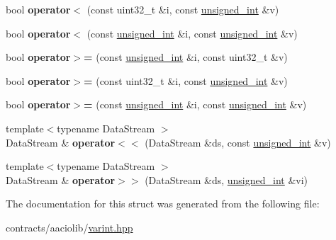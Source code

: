 \begin{DoxyCompactItemize}
bool {\bfseries operator$<$} (const uint32\+\_\+t \&i, const \mbox{\hyperlink{structunsigned__int}{unsigned\+\_\+int}} \&v)
\item 
\mbox{\label{structunsigned__int_a5c44ed2d978a1bdaf65166f98592192c}} 
bool {\bfseries operator$<$} (const \mbox{\hyperlink{structunsigned__int}{unsigned\+\_\+int}} \&i, const \mbox{\hyperlink{structunsigned__int}{unsigned\+\_\+int}} \&v)
\item 
\mbox{\label{structunsigned__int_abf1274ffb924723bc12f17544159c799}} 
bool {\bfseries operator$>$=} (const \mbox{\hyperlink{structunsigned__int}{unsigned\+\_\+int}} \&i, const uint32\+\_\+t \&v)
\item 
\mbox{\label{structunsigned__int_ad6f6d75188bb59e24af40ff8aa4de947}} 
bool {\bfseries operator$>$=} (const uint32\+\_\+t \&i, const \mbox{\hyperlink{structunsigned__int}{unsigned\+\_\+int}} \&v)
\item 
\mbox{\label{structunsigned__int_aedda267438195592daa499b41727101a}} 
bool {\bfseries operator$>$=} (const \mbox{\hyperlink{structunsigned__int}{unsigned\+\_\+int}} \&i, const \mbox{\hyperlink{structunsigned__int}{unsigned\+\_\+int}} \&v)
\item 
\mbox{\label{structunsigned__int_a3df4fdc722c22ec765f68db19116266e}} 
{\footnotesize template$<$typename Data\+Stream $>$ }\\Data\+Stream \& {\bfseries operator$<$$<$} (Data\+Stream \&ds, const \mbox{\hyperlink{structunsigned__int}{unsigned\+\_\+int}} \&v)
\item 
\mbox{\label{structunsigned__int_a63b42b42b55b512f25e5fc9ec6e20787}} 
{\footnotesize template$<$typename Data\+Stream $>$ }\\Data\+Stream \& {\bfseries operator$>$$>$} (Data\+Stream \&ds, \mbox{\hyperlink{structunsigned__int}{unsigned\+\_\+int}} \&vi)
\end{DoxyCompactItemize}


The documentation for this struct was generated from the following file\+:\begin{DoxyCompactItemize}
\item 
contracts/aaciolib/\mbox{\hyperlink{contracts_2aaciolib_2varint_8hpp}{varint.\+hpp}}\end{DoxyCompactItemize}
